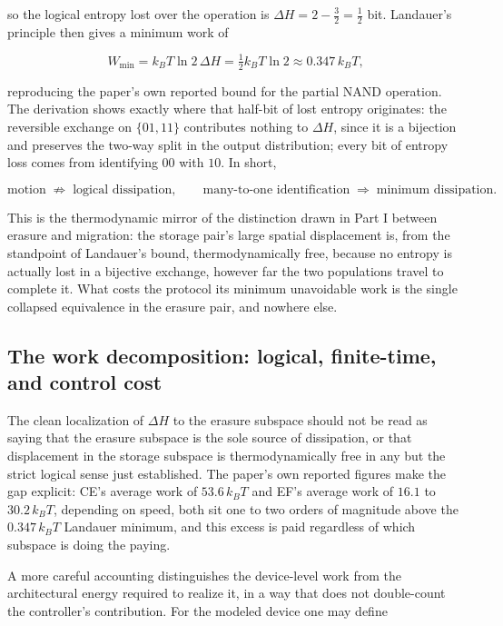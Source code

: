 \documentclass[11pt]{article}
\begin{document}
so the logical entropy lost over the operation is $\Delta H = 2-\tfrac32 = \tfrac12$ bit. Landauer's principle \cite{Landauer1961} then gives a minimum work of

\[
W_{\min} = k_BT\ln2\,\Delta H = \tfrac12 k_BT\ln2 \approx 0.347\,k_BT,
\]

reproducing the paper's own reported bound for the partial NAND operation. The derivation shows exactly where that half-bit of lost entropy originates: the reversible exchange on $\{01,11\}$ contributes nothing to $\Delta H$, since it is a bijection and preserves the two-way split in the output distribution; every bit of entropy loss comes from identifying $00$ with $10$. In short,

\[
\text{motion}\;\not\Rightarrow\;\text{logical dissipation}, \qquad \text{many-to-one identification}\;\Rightarrow\;\text{minimum dissipation}.
\]

This is the thermodynamic mirror of the distinction drawn in Part I between erasure and migration: the storage pair's large spatial displacement is, from the standpoint of Landauer's bound, thermodynamically free, because no entropy is actually lost in a bijective exchange, however far the two populations travel to complete it. What costs the protocol its minimum unavoidable work is the single collapsed equivalence in the erasure pair, and nowhere else.

\subsection{The work decomposition: logical, finite-time, and control cost}

The clean localization of $\Delta H$ to the erasure subspace should not be read as saying that the erasure subspace is the sole source of dissipation, or that displacement in the storage subspace is thermodynamically free in any but the strict logical sense just established. The paper's own reported figures make the gap explicit: CE's average work of $53.6\,k_BT$ and EF's average work of $16.1$ to $30.2\,k_BT$, depending on speed, both sit one to two orders of magnitude above the $0.347\,k_BT$ Landauer minimum, and this excess is paid regardless of which subspace is doing the paying.

A more careful accounting distinguishes the device-level work from the architectural energy required to realize it, in a way that does not double-count the controller's contribution. For the modeled device one may define
\end{document}
